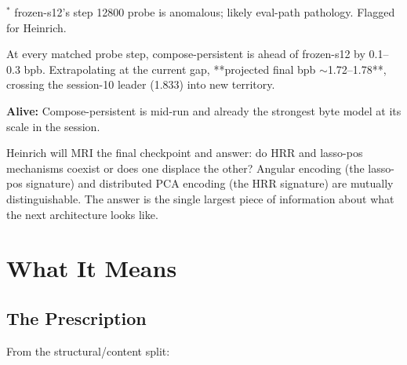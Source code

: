 \documentclass[11pt,a4paper]{report}
\newcommand{\alive}[1]{\textcolor{alive}{\textbf{Alive:}} #1}
\begin{document}
{\small $^*$ frozen-s12's step 12800 probe is anomalous; likely eval-path pathology. Flagged for Heinrich.}

At every matched probe step, compose-persistent is ahead of frozen-s12 by 0.1--0.3 bpb. Extrapolating at the current gap, **projected final bpb $\sim$1.72--1.78**, crossing the session-10 leader (1.833) into new territory.

\alive{Compose-persistent is mid-run and already the strongest byte model at its scale in the session.}

Heinrich will MRI the final checkpoint and answer: do HRR and lasso-pos mechanisms coexist or does one displace the other? Angular encoding (the lasso-pos signature) and distributed PCA encoding (the HRR signature) are mutually distinguishable. The answer is the single largest piece of information about what the next architecture looks like.


\part{What It Means}

\chapter{The Prescription}

From the structural/content split:
\end{document}
